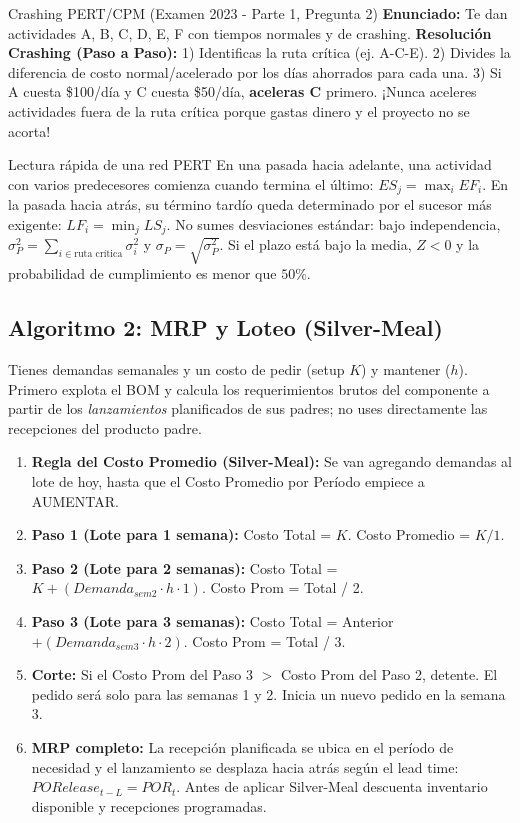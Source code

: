 \vspace{0.4cm}
\begin{ejercicio}{Crashing PERT/CPM (Examen 2023 - Parte 1, Pregunta 2)}
\textbf{Enunciado:} Te dan actividades A, B, C, D, E, F con tiempos normales y de crashing.
\textbf{Resolución Crashing (Paso a Paso):} 1) Identificas la ruta crítica (ej. A-C-E). 2) Divides la diferencia de costo normal/acelerado por los días ahorrados para cada una. 3) Si A cuesta \$100/día y C cuesta \$50/día, \textbf{aceleras C} primero. ¡Nunca aceleres actividades fuera de la ruta crítica porque gastas dinero y el proyecto no se acorta!
\end{ejercicio}

\begin{formulas}{Lectura rápida de una red PERT}
En una pasada hacia adelante, una actividad con varios predecesores comienza
cuando termina el último: $ES_j=\max_i EF_i$. En la pasada hacia atrás, su
término tardío queda determinado por el sucesor más exigente:
$LF_i=\min_j LS_j$. No sumes desviaciones estándar: bajo independencia,
$\sigma_P^2=\sum_{i\in\text{ruta crítica}}\sigma_i^2$ y
$\sigma_P=\sqrt{\sigma_P^2}$. Si el plazo está bajo la media, $Z<0$ y la
probabilidad de cumplimiento es menor que $50\%$.
\end{formulas}

\subsection{Algoritmo 2: MRP y Loteo (Silver-Meal)}
Tienes demandas semanales y un costo de pedir (setup $K$) y mantener ($h$).
Primero explota el BOM y calcula los requerimientos brutos del componente a
partir de los \emph{lanzamientos} planificados de sus padres; no uses
directamente las recepciones del producto padre.

\begin{enumerate}
    \item \textbf{Regla del Costo Promedio (Silver-Meal):} Se van agregando demandas al lote de hoy, hasta que el Costo Promedio por Período empiece a AUMENTAR.
    \item \textbf{Paso 1 (Lote para 1 semana):} Costo Total = $K$. Costo Promedio = $K / 1$.
    \item \textbf{Paso 2 (Lote para 2 semanas):} Costo Total = $K + (Demanda_{sem2} \cdot h \cdot 1)$. Costo Prom = Total / 2.
    \item \textbf{Paso 3 (Lote para 3 semanas):} Costo Total = Anterior $+ (Demanda_{sem3} \cdot h \cdot 2)$. Costo Prom = Total / 3.
    \item \textbf{Corte:} Si el Costo Prom del Paso 3 $>$ Costo Prom del Paso 2, detente. El pedido será solo para las semanas 1 y 2. Inicia un nuevo pedido en la semana 3.
    \item \textbf{MRP completo:} La recepción planificada se ubica en el período de necesidad y
    el lanzamiento se desplaza hacia atrás según el lead time:
    $PORelease_{t-L}=POR_t$. Antes de aplicar Silver-Meal descuenta inventario
    disponible y recepciones programadas.
\end{enumerate}

